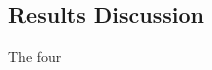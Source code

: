 \documentclass[conference]{IEEEtran}
\begin{document}
\subsection{Results Discussion}

The four 




\end{document}
